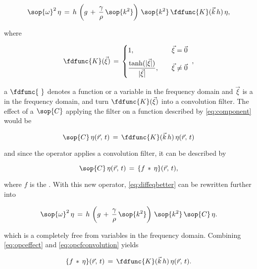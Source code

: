 \begin{equation} \label{eq:diffeqbetter}
\sop{\omega}^2\,\eta \,=\, h\,\left(g\,+\,\frac{\gamma}{\rho}\,\sop{k^2}\right)\,\sop{k^2}\,\fdfunc{K}(\vec{k}\,h)\,\eta,
\end{equation}

where

\begin{equation} \label{eq:transkernelofxivec}
\fdfunc{K}(\vec{\xi}) \,=\, \begin{cases}
1                                                  , & \quad \vec{\xi} = \vec{0} \\[.5em]
\displaystyle\frac{\tanh(|\vec{\xi}|)}{|\vec{\xi}|}, & \quad \vec{\xi} \neq \vec{0}
\end{cases}\ ,
\end{equation}

a $\fdfunc{\ }$ denotes a function or a variable in the frequency domain and $\vec{\xi}$ is a  in the frequency domain, and turn $\fdfunc{K}(\vec{\xi})$ into a convolution filter. The effect of a  $\sop{C}$ applying the filter on a function described by \eqref{eq:component} would be

\begin{equation} \label{eq:opceffect}
\sop{C}\,\eta(\vec{r},\,t) \,=\, \fdfunc{K}(\vec{k}\,h)\,\eta(\vec{r},\,t)
\end{equation}

and since the operator applies a convolution filter, it can be described by

\begin{equation} \label{eq:opcfconvolution}
\sop{C}\,\eta(\vec{r},\,t) \,=\, \{f\,*\,\eta\}(\vec{r},\,t),
\end{equation}

where $f$ is the . With this new operator, \eqref{eq:diffeqbetter} can be rewritten further into

\begin{equation} \label{eq:diffeqspatial}
\sop{\omega}^2\,\eta \,=\, h\,\left(g\,+\,\frac{\gamma}{\rho}\,\sop{k^2}\right)\,\sop{k^2}\,\sop{C}\,\eta.
\end{equation}

which is a \PDE completely free from variables in the frequency domain. Combining \eqref{eq:opceffect} and \eqref{eq:opcfconvolution} yields

\begin{equation} \label{eq:fconvolutioneffect}
\{f\,*\,\eta\}(\vec{r},\,t) \,=\, \fdfunc{K}(\vec{k}\,h)\,\eta(\vec{r},\,t).
\end{equation}


